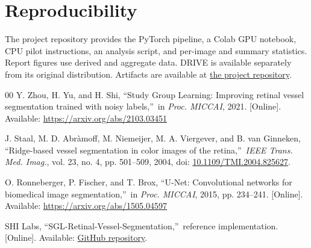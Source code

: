 \documentclass[a4paper,conference]{IEEEtran}
\begin{document}
\section*{Reproducibility}
The project repository provides the PyTorch pipeline, a Colab GPU notebook, CPU pilot instructions, an analysis script, and per-image and summary statistics. Report figures use derived and aggregate data. DRIVE is available separately from its original distribution. Artifacts are available at \href{https://github.com/A-cpu-rg/Retinal-vessel-segmentation-sgl}{the project repository}.

\begin{thebibliography}{00}
Y. Zhou, H. Yu, and H. Shi, \textquotedblleft Study Group Learning: Improving retinal vessel segmentation trained with noisy labels,\textquotedblright\ in \emph{Proc. MICCAI}, 2021. [Online]. Available: \url{https://arxiv.org/abs/2103.03451}

J. Staal, M. D. Abràmoff, M. Niemeijer, M. A. Viergever, and B. van Ginneken, \textquotedblleft Ridge-based vessel segmentation in color images of the retina,\textquotedblright\ \emph{IEEE Trans. Med. Imag.}, vol. 23, no. 4, pp. 501--509, 2004, doi: \href{https://doi.org/10.1109/TMI.2004.825627}{10.1109/TMI.2004.825627}.

O. Ronneberger, P. Fischer, and T. Brox, \textquotedblleft U-Net: Convolutional networks for biomedical image segmentation,\textquotedblright\ in \emph{Proc. MICCAI}, 2015, pp. 234--241. [Online]. Available: \url{https://arxiv.org/abs/1505.04597}

SHI Labs, \textquotedblleft SGL-Retinal-Vessel-Segmentation,\textquotedblright\ reference implementation. [Online]. Available: \href{https://github.com/SHI-Labs/SGL-Retinal-Vessel-Segmentation}{GitHub repository}.
\end{thebibliography}
\end{document}
